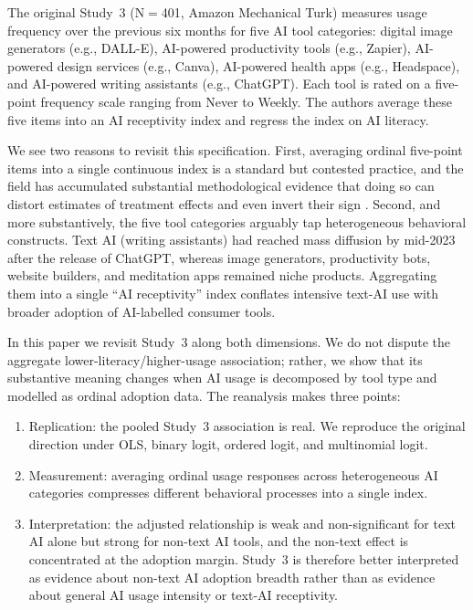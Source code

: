 \documentclass[11pt]{article}
\begin{document}
The original Study~3 (N$=$401, Amazon Mechanical Turk) measures usage frequency
over the previous six months for five AI tool categories: digital image
generators (e.g., DALL-E), AI-powered productivity tools (e.g., Zapier),
AI-powered design services (e.g., Canva), AI-powered health apps (e.g.,
Headspace), and AI-powered writing assistants (e.g., ChatGPT). Each tool is
rated on a five-point frequency scale ranging from Never to
Weekly. The authors average these five items into an AI receptivity
index and regress the index on AI literacy.

We see two reasons to revisit this specification. First, averaging ordinal
five-point items into a single continuous index is a standard but contested
practice, and the field has accumulated substantial methodological evidence
that doing so can distort estimates of treatment effects and even invert their
sign \citep{liddell2018analyzing,agresti2010analysis}. Second, and more
substantively, the five tool categories arguably tap heterogeneous behavioral
constructs. Text AI (writing assistants) had reached mass diffusion by mid-2023
after the release of ChatGPT, whereas image generators, productivity bots,
website builders, and meditation apps remained niche products. Aggregating them
into a single ``AI receptivity'' index conflates intensive text-AI use with
broader adoption of AI-labelled consumer tools.

In this paper we revisit Study~3 along both dimensions. We do not dispute the
aggregate lower-literacy/higher-usage association; rather, we show that its
substantive meaning changes when AI usage is decomposed by tool type and
modelled as ordinal adoption data. The reanalysis makes three points:

\begin{enumerate}
  \item Replication: the pooled Study~3 association is real. We
  reproduce the original direction under OLS, binary logit, ordered logit,
  and multinomial logit.
  \item Measurement: averaging ordinal usage responses across
  heterogeneous AI categories compresses different behavioral processes into a
  single index.
  \item Interpretation: the adjusted relationship is weak
  and non-significant for text AI alone but strong for non-text AI tools, and
  the non-text effect is concentrated at the adoption margin. Study~3 is
  therefore better interpreted as evidence about non-text AI adoption
  breadth rather than as evidence about general AI usage intensity or
  text-AI receptivity.
\end{enumerate}
\end{document}
